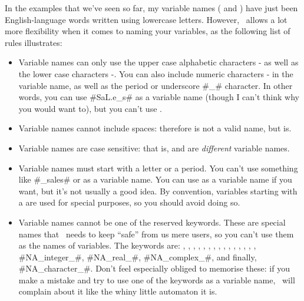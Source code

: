 
In the examples that we've seen so far, my variable names ( and ) have just been English-language words written using lowercase letters. However, \R\ allows a lot more flexibility when it comes to naming your variables, as the following list of rules illustrates:

\begin{itemize}
\item Variable names can only use the upper case alphabetic characters - as well as the lower case characters -{}. You can also include numeric characters - in the variable name, as well as the period  or underscore \rtextverb#_# character. In other words, you can use \rtextverb#SaL.e_s# as a variable name (though I can't think why you would want to), but you can't use . 
\item Variable names cannot include spaces: therefore  is not a valid name, but  is.
\item Variable names are case sensitive: that is,  and  are {\it different} variable names.
\item Variable names must start with a letter or a period. You can't use something like \rtextverb#_sales# or  as a variable name. You can use  as a variable name if you want, but it's not usually a good idea. By convention, variables starting with a  are used for special purposes, so you should avoid doing so. 
\item Variable names cannot be one of the reserved keywords. These are special names that \R\ needs to keep ``safe'' from us mere users, so you can't use them as the names of variables. The keywords are: , , , , , , , , , , , , , , , \rtextverb#NA_integer_#, \rtextverb#NA_real_#, \rtextverb#NA_complex_#, and finally,  \rtextverb#NA_character_#. Don't feel especially obliged to memorise these: if you make a mistake and try to use one of the keywords as a variable name, \R\ will complain about it like the whiny little automaton it is.
\end{itemize}

